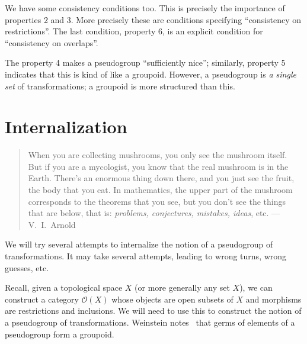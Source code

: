 \documentclass{article}
\begin{document}
We have some consistency conditions too. This is precisely the
importance of properties 2 and 3. More precisely these are
conditions specifying ``consistency on restrictions''. The last
condition, property 6, is an explicit condition for ``consistency
on overlaps''. 

The property 4 makes a pseudogroup ``sufficiently nice'';
similarly, property 5 indicates that this is kind of like a
groupoid. However, a pseudogroup is \emph{a single set} of
transformations; a groupoid is more structured than this.

\section{Internalization}

\begin{quote}
When you are collecting mushrooms, you only see the mushroom
itself. But if you are a mycologist, you know that the real
mushroom is in the Earth. There's an enormous thing down there,
and you just see the fruit, the body that you eat. In
mathematics, the upper part of the mushroom corresponds to the
theorems that you see, but you don't see the things that are
below, that is: \emph{problems, conjectures, mistakes, ideas},
etc. --- V.~I.~Arnold~\cite{arnol2004hilbert}
\end{quote}

We will try several attempts to internalize the notion of a
pseudogroup of transformations. It may take several attempts,
leading to wrong turns, wrong guesses, etc. 

Recall, given a topological space $X$ (or more generally any set
$X$), we can construct a category $\mathcal{O}(X)$ whose objects
are open subsets of $X$ and morphisms are restrictions and
inclusions. We will need to use this to construct the notion of a
pseudogroup of transformations. Weinstein notes~\cite{weinstein1996groupoids}
that germs of elements of a pseudogroup form a groupoid.


\nocite{*}


\end{document}
